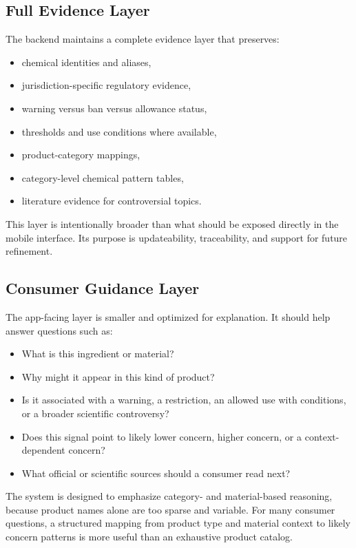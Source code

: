 \documentclass[11pt]{article}
\begin{document}
\subsection{Full Evidence Layer}

The backend maintains a complete evidence layer that preserves:

\begin{itemize}[leftmargin=1.5em]
\item chemical identities and aliases,
\item jurisdiction-specific regulatory evidence,
\item warning versus ban versus allowance status,
\item thresholds and use conditions where available,
\item product-category mappings,
\item category-level chemical pattern tables,
\item literature evidence for controversial topics.
\end{itemize}

This layer is intentionally broader than what should be exposed directly in the mobile interface. Its purpose is updateability, traceability, and support for future refinement.

\subsection{Consumer Guidance Layer}

The app-facing layer is smaller and optimized for explanation. It should help answer questions such as:

\begin{itemize}[leftmargin=1.5em]
\item What is this ingredient or material?
\item Why might it appear in this kind of product?
\item Is it associated with a warning, a restriction, an allowed use with conditions, or a broader scientific controversy?
\item Does this signal point to likely lower concern, higher concern, or a context-dependent concern?
\item What official or scientific sources should a consumer read next?
\end{itemize}

The system is designed to emphasize category- and material-based reasoning, because product names alone are too sparse and variable. For many consumer questions, a structured mapping from product type and material context to likely concern patterns is more useful than an exhaustive product catalog.
\end{document}
